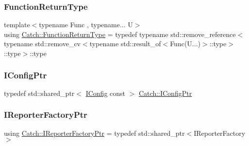 \mbox{\label{namespace_catch_a3051165b0eea6023939f0f8a71ecf03f}} 
\subsubsection{\texorpdfstring{Function\+Return\+Type}{FunctionReturnType}}
{\footnotesize\ttfamily template$<$typename Func , typename... U$>$ \\
using \mbox{\hyperlink{namespace_catch_a3051165b0eea6023939f0f8a71ecf03f}{Catch\+::\+Function\+Return\+Type}} = typedef typename std\+::remove\+\_\+reference$<$typename std\+::remove\+\_\+cv$<$typename std\+::result\+\_\+of$<$Func(U...)$>$\+::type$>$\+::type$>$\+::type}

\mbox{\label{namespace_catch_afd20a5d4f9d2f4d525db81a7765367b0}} 
\subsubsection{\texorpdfstring{I\+Config\+Ptr}{IConfigPtr}}
{\footnotesize\ttfamily typedef std\+::shared\+\_\+ptr$<$ \mbox{\hyperlink{struct_catch_1_1_i_config}{I\+Config}} const  $>$ \mbox{\hyperlink{namespace_catch_afd20a5d4f9d2f4d525db81a7765367b0}{Catch\+::\+I\+Config\+Ptr}}}

\mbox{\label{namespace_catch_ad1b36ac40c2739e52fd453dcdddf0d09}} 
\subsubsection{\texorpdfstring{I\+Reporter\+Factory\+Ptr}{IReporterFactoryPtr}}
{\footnotesize\ttfamily using \mbox{\hyperlink{namespace_catch_ad1b36ac40c2739e52fd453dcdddf0d09}{Catch\+::\+I\+Reporter\+Factory\+Ptr}} = typedef std\+::shared\+\_\+ptr$<$I\+Reporter\+Factory$>$}

\mbox{\label{namespace_catch_aba438977e831821a2eeca82b9b4f4af2}} 
